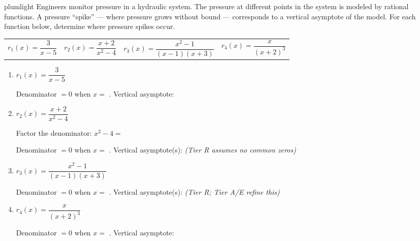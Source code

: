 \documentclass[10pt]{article}
\begin{document}
\namepartnerperiod

\vspace{0.1in}

\begin{scenariobox}{plumlight}
\small
Engineers monitor pressure in a hydraulic system. The pressure at different points in the
system is modeled by rational functions. A pressure ``spike'' --- where pressure grows without
bound --- corresponds to a vertical asymptote of the model. For each function below, determine
where pressure spikes occur.

\medskip
\renewcommand{\arraystretch}{1.4}
\begin{tabular}{@{} l l @{\qquad} l l @{}}
$r_1(x) = \dfrac{3}{x - 5}$ &
$r_2(x) = \dfrac{x + 2}{x^2 - 4}$ &
$r_3(x) = \dfrac{x^2 - 1}{(x-1)(x+3)}$ &
$r_4(x) = \dfrac{x}{(x+2)^3}$
\end{tabular}
\end{scenariobox}

\vspace{0.1in}

\begin{tcolorbox}[colback=white, colframe=black!40,
    title=\textbf{Tier R --- Remediate},
    fonttitle=\bfseries, arc=2mm, left=3mm, right=3mm, top=2mm, bottom=2mm]

\begin{enumerate}[itemsep=10pt]
  \item $r_1(x) = \dfrac{3}{x - 5}$

        Denominator $= 0$ when $x =$ . \quad Vertical asymptote: 

  \item $r_2(x) = \dfrac{x + 2}{x^2 - 4}$

        Factor the denominator: $x^2 - 4 =$ 

        Denominator $= 0$ when $x =$ . \quad
        Vertical asymptote(s):  \textit{(Tier R assumes no common zeros)}

  \item $r_3(x) = \dfrac{x^2 - 1}{(x-1)(x+3)}$

        Denominator $= 0$ when $x =$ . \quad
        Vertical asymptote(s):  \textit{(Tier R; Tier A/E refine this)}

  \item $r_4(x) = \dfrac{x}{(x+2)^3}$

        Denominator $= 0$ when $x =$ . \quad Vertical asymptote: 
\end{enumerate}
\end{tcolorbox}
\end{document}
